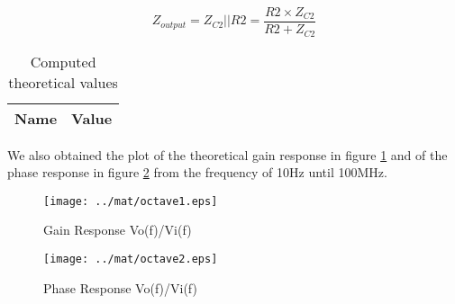 \begin{equation}
Z_{output} = Z_{C2}||R2 = \frac{R2 \times Z_{C2}}{R2 + Z_{C2}}
\label{eq:1.12}
\end{equation}

\begin{table}[H]
  \centering
  \begin{tabular}{|l|r|}
    \hline    
    {\bf Name} & {\bf Value} \\ \hline
    
  \end{tabular}
  \caption{Computed theoretical values}
  \label{tab:mat2}
\end{table}

We also obtained the plot of the theoretical gain response in figure \ref{fig:mat3} and of the phase response in figure \ref{fig:mat4} from the frequency of 10Hz until 100MHz.

\begin{figure}[H] \centering
\texttt{[image: ../mat/octave1.eps]}
\caption{Gain Response Vo(f)/Vi(f)}
\label{fig:mat3}
\end{figure}

\begin{figure}[H] \centering
\texttt{[image: ../mat/octave2.eps]}
\caption{Phase Response Vo(f)/Vi(f)}
\label{fig:mat4}
\end{figure}







